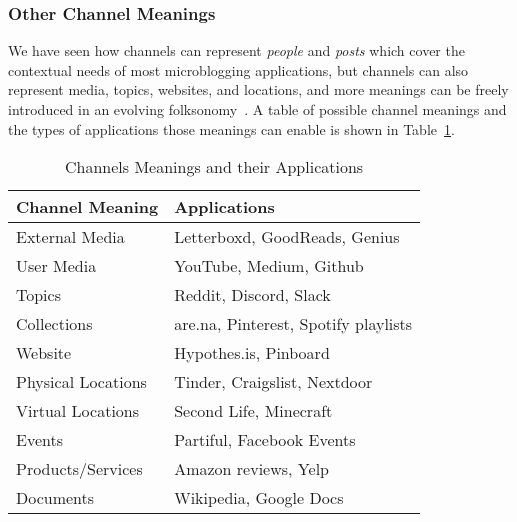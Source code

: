 

\subsubsection{Other Channel Meanings}

We have seen how channels can represent \emph{people} and \emph{posts}
which cover the contextual needs of most microblogging applications,
but channels can also represent media, topics, websites, and locations,
and more meanings can be freely introduced in an evolving folksonomy~\cite{folksonomy}.
A table of possible channel meanings and the types of applications
those meanings can enable is shown in Table~\ref{concepts:channels-and-applications}.


\begin{table}[h]
\small
\caption{Channels Meanings and their Applications}
\label{concepts:channels-and-applications}
\centering
\begin{tabular}{|l|l|}
\hline
\textbf{Channel Meaning} & \textbf{Applications} \\ \hline
External Media & Letterboxd, GoodReads, Genius \\ \hline
User Media & YouTube, Medium, Github \\ \hline
Topics & Reddit, Discord, Slack \\ \hline
Collections & are.na, Pinterest, Spotify playlists \\ \hline
Website & Hypothes.is, Pinboard \\ \hline
Physical Locations & Tinder, Craigslist, Nextdoor \\ \hline
Virtual Locations & Second Life, Minecraft \\ \hline
Events & Partiful, Facebook Events \\ \hline
Products/Services & Amazon reviews, Yelp \\ \hline
Documents & Wikipedia, Google Docs \\ \hline
\end{tabular}
\end{table}


